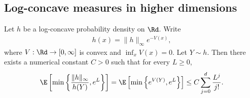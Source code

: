 \subsection{Log-concave measures in higher dimensions}
\begin{lemma}
    \label{lem:log_concave_truncated_exp_potential}
    Let $h$ be a log-concave probability density on $\Rd$. Write
    \begin{align}
        h(x)=\|h\|_\infty e^{-V(x)},
    \end{align}
    where $V:\Rd\to[0,\infty]$ is convex and $\inf_x V(x)=0$.
    Let $Y\sim h$. Then there exists a numerical constant $C>0$ such that
    for every $L\ge0$,
    \begin{align}
        \E\left[
            \min\left\{\frac{\|h\|_\infty}{h(Y)},e^L\right\}
            \right]
        =
        \E\left[
            \min\left\{e^{V(Y)},e^L\right\}
            \right]
        \le
        C
        \sum_{j=0}^d \frac{L^j}{j!}.
        \label{eq:log_concave_truncated_exp_potential}
    \end{align}
\end{lemma}

